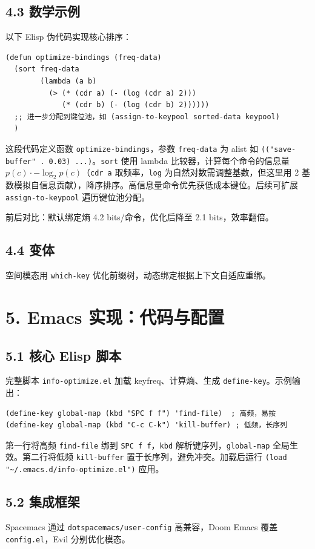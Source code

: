 \section{4.3 数学示例}
以下 Elisp 伪代码实现核心排序：\par
\begin{lstlisting}[language=elisp]
(defun optimize-bindings (freq-data)
  (sort freq-data
        (lambda (a b)
          (> (* (cdr a) (- (log (cdr a) 2)))
             (* (cdr b) (- (log (cdr b) 2))))))
  ;; 进一步分配到键位池，如 (assign-to-keypool sorted-data keypool)
  )
\end{lstlisting}
这段代码定义函数 \texttt{optimize-bindings}，参数 \texttt{freq-data} 为 alist 如 \texttt{(("save-buffer" . 0.03) ...)}。\texttt{sort} 使用 lambda 比较器，计算每个命令的信息量 $p(c) \cdot -\log _2 p(c)$（\texttt{cdr a} 取频率，\texttt{log} 为自然对数需调整基数，但这里用 2 基数模拟自信息贡献），降序排序。高信息量命令优先获低成本键位。后续可扩展 \texttt{assign-to-keypool} 遍历键位池分配。\par
前后对比：默认绑定熵 4.2 bits/命令，优化后降至 2.1 bits，效率翻倍。\par
\section{4.4 变体}
空间模态用 \texttt{which-key} 优化前缀树，动态绑定根据上下文自适应重绑。\par
\chapter{5. Emacs 实现：代码与配置}
\section{5.1 核心 Elisp 脚本}
完整脚本 \texttt{info-optimize.el} 加载 keyfreq、计算熵、生成 \texttt{define-key}。示例输出：\par
\begin{lstlisting}[language=elisp]
(define-key global-map (kbd "SPC f f") 'find-file)  ; 高频，易按
(define-key global-map (kbd "C-c C-k") 'kill-buffer) ; 低频，长序列
\end{lstlisting}
第一行将高频 \texttt{find-file} 绑到 \texttt{SPC f f}，\texttt{kbd} 解析键序列，\texttt{global-map} 全局生效。第二行将低频 \texttt{kill-buffer} 置于长序列，避免冲突。加载后运行 \texttt{(load "\~{}/.emacs.d/info-optimize.el")} 应用。\par
\section{5.2 集成框架}
Spacemacs 通过 \texttt{dotspacemacs/user-config} 高兼容，Doom Emacs 覆盖 \texttt{config.el}，Evil 分别优化模态。\par
